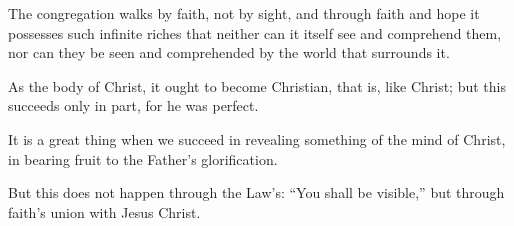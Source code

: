 The congregation walks by faith, not by sight, and through faith and hope it possesses such infinite riches that neither can it itself see and comprehend them, nor can they be seen and comprehended by the world that surrounds it.

As the body of Christ, it ought to become Christian, that is, like Christ; but this succeeds only in part, for he was perfect.

It is a great thing when we succeed in revealing something of the mind of Christ, in bearing fruit to the Father’s glorification.

But this does not happen through the Law’s: “You shall be visible,” but through faith’s union with Jesus Christ.

